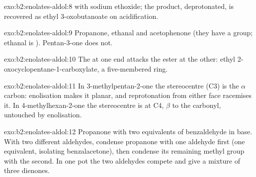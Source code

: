 \begin{solution}{exo:b2:enolates-aldol:8}
 with sodium ethoxide; the product, deprotonated, is
recovered as ethyl 3-oxobutanoate on acidification.
\end{solution}

\begin{solution}{exo:b2:enolates-aldol:9}
Propanone, ethanal and acetophenone (they have a  group; ethanal is ).
Pentan-3-one does not.
\end{solution}

\begin{solution}{exo:b2:enolates-aldol:10}
The  at one end attacks the ester at the other: ethyl 2-oxocyclopentane-1-carboxylate, a
five-membered ring.
\end{solution}

\begin{solution}{exo:b2:enolates-aldol:11}
In 3-methylpentan-2-one the stereocentre (C3) is the $\alpha$ carbon: enolisation makes it planar, and
reprotonation from either face racemises it. In 4-methylhexan-2-one the stereocentre is at C4,
$\beta$ to the carbonyl, untouched by enolisation.
\end{solution}

\begin{solution}{exo:b2:enolates-aldol:12}
Propanone with two equivalents of benzaldehyde in base. With two different aldehydes, condense
propanone with one aldehyde first (one equivalent, isolating benzalacetone), then condense its
remaining methyl group with the second. In one pot the two aldehydes compete and give a mixture of
three dienones.
\end{solution}

